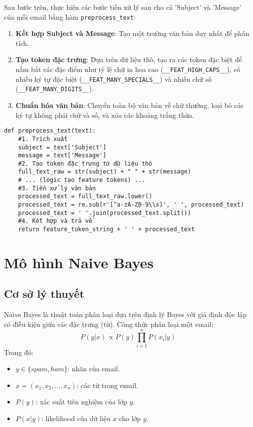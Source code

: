 Sau bước trên, thực hiện các bước tiền xử lý sau cho cả 'Subject' và 'Message' của mỗi email bằng hàm \texttt{preprocess\_text}:
\begin{enumerate}
    \item \textbf{Kết hợp Subject và Message}: Tạo một trường văn bản duy nhất để phân tích.
    \item \textbf{Tạo token đặc trưng}: Dựa trên dữ liệu thô, tạo ra các token đặc biệt để nắm bắt các đặc điểm như tỷ lệ chữ in hoa cao (\texttt{\_\_FEAT\_HIGH\_CAPS\_\_}), có nhiều ký tự đặc biệt (\texttt{\_\_FEAT\_MANY\_SPECIALS\_\_}) và nhiều chữ số (\texttt{\_\_FEAT\_MANY\_DIGITS\_\_}).
    \item \textbf{Chuẩn hóa văn bản}: Chuyển toàn bộ văn bản về chữ thường, loại bỏ các ký tự không phải chữ và số, và xóa các khoảng trắng thừa.
\end{enumerate}

\begin{verbatim}
def preprocess_text(text):
    #1. Trích xuất
    subject = text['Subject']
    message = text['Message']
    #2. Tạo token đặc trưng từ dữ liệu thô
    full_text_raw = str(subject) + " " + str(message)
    # ... (logic tạo feature tokens) ...
    #3. Tiền xử lý văn bản
    processed_text = full_text_raw.lower()
    processed_text = re.sub(r'[^a-zA-Z0-9\\s]', ' ', processed_text)
    processed_text = ' '.join(processed_text.split())
    #4. Kết hợp và trả về
    return feature_token_string + ' ' + processed_text
\end{verbatim}



\section{Mô hình Naive Bayes}

\subsection{Cơ sở lý thuyết}
Naive Bayes là thuật toán phân loại dựa trên định lý Bayes với giả định độc lập có điều kiện giữa các đặc trưng (từ). Công thức phân loại một email:
$$P(y|x) \propto P(y) \prod_{i=1}^{n} P(x_i|y)$$
Trong đó:
\begin{itemize}
    \item $y \in \{spam, ham\}$: nhãn của email.
    \item $x = (x_1, x_2, ..., x_n)$: các từ trong email.
    \item $P(y)$: xác suất tiên nghiệm của lớp $y$.
    \item $P(x|y)$: likelihood của dữ liệu $x$ cho lớp $y$.
\end{itemize}

